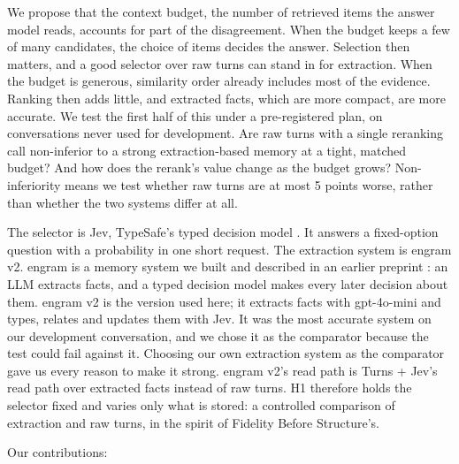 \documentclass[11pt]{article}
\newcommand{\src}[1]{}
\begin{document}
We propose that the context budget, the number of retrieved items the answer model reads, accounts for part of the disagreement. When the budget keeps a few of many candidates, the choice of items decides the answer. Selection then matters, and a good selector over raw turns can stand in for extraction. When the budget is generous, similarity order already includes most of the evidence. Ranking then adds little, and extracted facts, which are more compact, are more accurate. We test the first half of this under a pre-registered plan, on conversations never used for development. Are raw turns with a single reranking call non-inferior to a strong extraction-based memory at a tight, matched budget? And how does the rerank's value change as the budget grows? Non-inferiority means we test whether raw turns are at most 5\src{docs/V3\_PLAN.md §1, §2, §4} points worse, rather than whether the two systems differ at all.

The selector is Jev, TypeSafe's typed decision model \citep{typesafe2026launch,typesafe2026jev}. It answers a fixed-option question with a probability in one short request. The extraction system is engram v2. engram is a memory system we built and described in an earlier preprint \citep{sharma2026typed}: an LLM extracts facts, and a typed decision model makes every later decision about them. engram v2 is the version used here; it extracts facts with gpt-4o-mini and types, relates and updates them with Jev. It was the most accurate system on our development conversation, and we chose it as the comparator because the test could fail against it. Choosing our own extraction system as the comparator gave us every reason to make it strong. engram v2's read path is Turns + Jev's read path over extracted facts instead of raw turns. H1 therefore holds the selector fixed and varies only what is stored: a controlled comparison of extraction and raw turns, in the spirit of Fidelity Before Structure's.

Our contributions:
\end{document}
